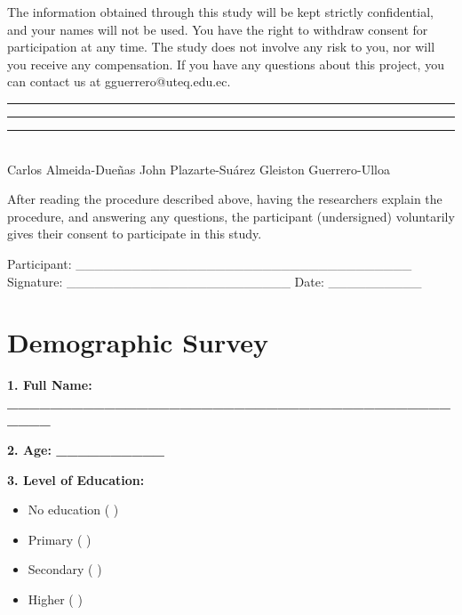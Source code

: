 \documentclass[a4paper,fleqn]{cas-sc}
\begin{document}
	The information obtained through this study will be kept strictly confidential, and your names will not be used. You have the right to withdraw consent for participation at any time. The study does not involve any risk to you, nor will you receive any compensation. If you have any questions about this project, you can contact us at gguerrero@uteq.edu.ec.
	
	\vspace{0.5cm}
	\noindent\rule{3.65cm}{0.4pt} \hspace{1.1cm} \rule{4cm}{0.4pt} \hspace{1.1cm} \rule{4.2cm}{0.4pt}\\
	Carlos Almeida-Dueñas \hspace{2cm} John Plazarte-Suárez \hspace{2cm} Gleiston Guerrero-Ulloa
	
	After reading the procedure described above, having the researchers explain the procedure, and answering any questions, the participant (undersigned) voluntarily gives their consent to participate in this study.
	
	\vspace{0.5cm}
	\noindent
	Participant: \_\_\_\_\_\_\_\_\_\_\_\_\_\_\_\_\_\_\_\_\_\_\_\_\_\_\_\_\_\_\_\_\_\_\_\_
	Signature: \_\_\_\_\_\_\_\_\_\_\_\_\_\_\_\_\_\_\_\_\_\_\_\_
	Date: \_\_\_\_\_\_\_\_\_\_

	\clearpage
	\section[\appendixname~\thesection]{Demographic Survey} \label{Appendix:DemographicSurvey}
	\vspace{12pt}
	\noindent
	\textbf{1. Full Name: \_\_\_\_\_\_\_\_\_\_\_\_\_\_\_\_\_\_\_\_\_\_\_\_\_\_\_\_\_\_\_\_\_\_\_\_\_\_\_\_\_\_\_\_\_}
	
	\vspace{12pt}
	\noindent
	\textbf{2. Age: \_\_\_\_\_\_\_\_\_\_}
	
	\vspace{12pt}
	\noindent				
	\textbf{3. Level of Education:}
	
	\begin{itemize}
		\item No education ( )
		\item Primary ( )
		\item Secondary ( )
		\item Higher ( )
	\end{itemize}
	
\end{document}
